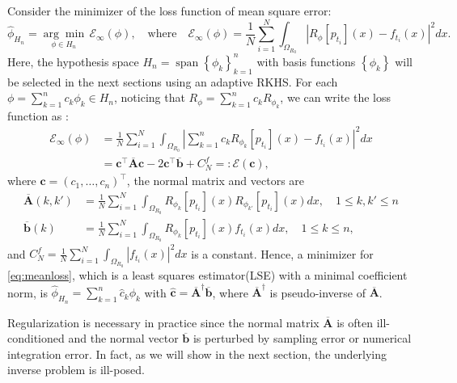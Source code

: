\documentclass[12pt]{article}
\def\Abar{ {\overline{A}} }
\def\bbar{ {\overline{b}} }
\numberwithin{equation}{section}
\numberwithin{theorem}{section}
\begin{document}
Consider the minimizer of the loss function of mean square error:
\begin{equation}
\label{eq:meanloss}
    \widehat{\phi}_{H_n}=\underset{\phi\in H_n}{\arg \min } \, \mathcal{E}_\infty (\phi),  \quad \text{where} \quad \mathcal{E}_\infty (\phi)=\frac{1}{N} \sum_{i=1}^N \int_{\Omega_{R_0}}\left|R_{\phi}\left[p_{t_i}\right](x)-f_{t_i}(x)\right|^2 dx.
\end{equation}
Here, the hypothesis space 
$H_n= \operatorname{span}\left\{{\phi}_k\right\}_{k=1}^n	
$ with basis functions $\left\{{\phi}_k\right\}$ will be selected in the next sections using an adaptive RKHS. For each $\phi=\sum_{k=1}^n c_k {\phi}_k \in H_n$, noticing that $R_{\phi}=\sum_{k=1}^n c_k R_{{\phi}_k}$, we can write the loss function as :
\begin{equation}
\label{eq: loss}
\begin{aligned}
\mathcal{E}_\infty \left(\phi\right)
  & =\frac{1}{N} \sum_{i=1}^N \int_{\Omega_{R_0}} \left|\sum_{k=1}^n c_k R_{{\phi}_k}\left[p_{t_i}\right](x)-f_{t_i}(x)\right|^2 dx\\
  & = \mathbf{c}^\top  \mathbf{\Abar}  \mathbf{c} - 2 \mathbf{c}^\top \mathbf{\bbar} + C_N^f =:  \mathcal{E}(\mathbf{c}), 
\end{aligned}
\end{equation}
where $\mathbf{c}= (c_1,\ldots,c_n)^\top$, the normal matrix and vectors are 
\begin{equation}
\label{eq:Aandb}
\begin{aligned}
 \mathbf{\Abar}(k, k')
    & = \frac{1}{N} \sum_{i=1}^N \int_{\Omega_{R_0}} R_{{\phi}_k}\left[p_{t_i}\right](x)R_{{\phi}_{k'}}\left[p_{t_i}\right](x) dx, \quad 1\leq k,k'\leq n 
\\
\mathbf{\bbar}(k) & =\frac{1}{N}\sum_{i=1}^N \int_{\Omega_{R_0}}R_{{\phi}_k}\left[p_{t_i}\right](x) f_{t_i}(x)  dx , \quad 1\leq k\leq n,  
\end{aligned}
\end{equation}
and $C_N^{f}=\frac{1}{N} \sum_{i=1}^N \int_{\Omega_{R_0}} \left|f_{t_i}(x)\right|^2 dx $ is a constant. Hence, a minimizer for \eqref{eq:meanloss}, which is a least squares estimator(LSE) with a minimal coefficient norm,  is  $\widehat{\phi}_{H_n}=\sum_{k=1}^n \widehat{c}_k {\phi}_k$ with  $\widehat{\mathbf{c}}=\mathbf{\Abar}^{\dag} \mathbf{\bbar}$, where $\mathbf{\Abar}^{\dag}$ is pseudo-inverse of $\mathbf{\Abar}$. 

Regularization is necessary in practice since the normal matrix $\mathbf{\Abar}$ is often ill-conditioned and the normal vector $\mathbf{\bbar}$ is perturbed by sampling error or numerical integration error. In fact, as we will show in the next section, the underlying inverse problem is ill-posed.  
\end{document}
